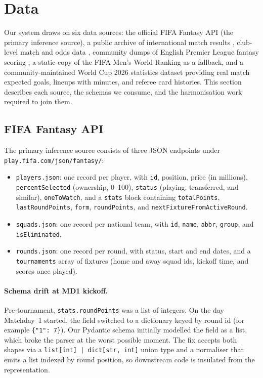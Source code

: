 \section{Data}
\label{sec:data}

Our system draws on six data sources: the official FIFA Fantasy API
(the primary inference source), a public archive of international
match results \citep{martj42}, club-level match and odds data
\citep{footballdata}, community dumps of English Premier League
fantasy scoring \citep{vaastav}, a static copy of the FIFA Men's
World Ranking as a fallback, and a community-maintained World Cup
2026 statistics dataset \citep{mominul2026dataset} providing real
match expected goals, lineups with minutes, and referee card
histories. This section describes each source, the schemas we
consume, and the harmonisation work required to join them.

\subsection{FIFA Fantasy API}
\label{sec:data-fifa-api}

The primary inference source consists of three JSON endpoints under
\texttt{play.fifa.com/json/fantasy/}:

\begin{itemize}
\item \texttt{players.json}: one record per player, with \texttt{id},
  position, price (in millions), \texttt{percentSelected} (ownership,
  0--100), \texttt{status} (playing, transferred, and similar),
  \texttt{oneToWatch}, and a \texttt{stats} block containing
  \texttt{totalPoints}, \texttt{lastRoundPoints}, \texttt{form},
  \texttt{roundPoints}, and \texttt{nextFixtureFromActiveRound}.
\item \texttt{squads.json}: one record per national team, with
  \texttt{id}, \texttt{name}, \texttt{abbr}, \texttt{group}, and
  \texttt{isEliminated}.
\item \texttt{rounds.json}: one record per round, with status, start
  and end dates, and a \texttt{tournaments} array of fixtures (home
  and away squad ids, kickoff time, and scores once played).
\end{itemize}

\paragraph{Schema drift at MD1 kickoff.}
Pre-tournament, \texttt{stats.roundPoints} was a list of integers. On
the day Matchday~1 started, the field switched to a dictionary keyed
by round id (for example \texttt{\{"1": 7\}}). Our Pydantic schema
initially modelled the field as a list, which broke the parser at the
worst possible moment. The fix accepts both shapes via a
\texttt{list[int] | dict[str, int]} union type and a normaliser that
emits a list indexed by round position, so downstream code is
insulated from the representation.

